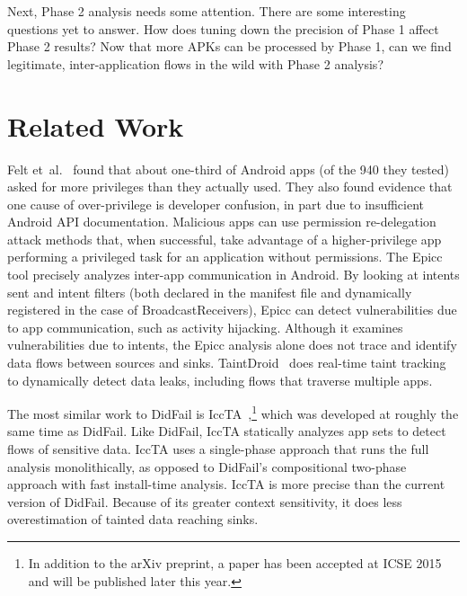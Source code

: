 Next, Phase 2 analysis needs some attention. There are some interesting questions yet to answer. How does tuning down the precision of Phase 1 affect Phase 2 results?  Now that more APKs can be processed by Phase 1, can we find legitimate, inter-application flows in the wild with Phase 2 analysis?
\newpage
\chapter{Related Work}
Felt et\ al.~\cite{felt2011android} found that about one-third of Android apps (of the 940 they tested) asked for more privileges than they actually used. They also found evidence that one cause of over-privilege is developer confusion, in part due to insufficient Android API documentation. Malicious apps can use permission re-delegation attack methods \cite{felt2011permission} that, when successful, take advantage of a higher-privilege app performing a privileged task for an application without permissions. The Epicc \cite{epicc} tool precisely analyzes inter-app communication in Android.  By looking at intents sent and intent filters (both declared in the manifest file and  dynamically registered in the case of BroadcastReceivers), Epicc can detect vulnerabilities due to app communication, such as activity hijacking. Although it examines vulnerabilities due to intents, the Epicc analysis alone does not trace and identify data flows between sources and sinks. 
TaintDroid~\cite{enck2010taintdroid} does real-time taint tracking to dynamically detect data leaks, including flows that traverse multiple apps.

The most similar work to DidFail is IccTA~\cite{li2014know},\footnote{In addition to the arXiv preprint, a paper has been accepted at ICSE 2015 and will be published later this year.} which was developed at roughly the same time as DidFail. Like DidFail, IccTA statically analyzes app sets to detect flows of sensitive data. IccTA uses a single-phase approach that runs the full analysis monolithically, as opposed to DidFail's compositional two-phase approach with fast install-time analysis. IccTA is more precise than the current version of DidFail. Because of its greater context sensitivity, it does less overestimation of tainted data reaching sinks.

